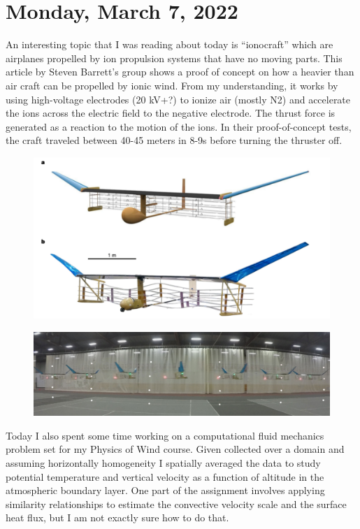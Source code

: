 \documentclass[12pt]{article}
\begin{document}
\section{Monday, March 7, 2022}
\par
An interesting topic that I was reading about today is “ionocraft” which are airplanes propelled by ion propulsion systems that have no moving parts. This article by Steven Barrett’s group shows a proof of concept on how a heavier than air craft can be propelled by ionic wind. From my understanding, it works by using high-voltage electrodes (20 kV+?) to ionize air (mostly N2) and accelerate the ions across the electric field to the negative electrode.  The thrust force is generated as a reaction to the motion of the ions. In their proof-of-concept tests, the craft traveled between 40-45 meters in 8-9s before turning the thruster off.

\begin{figure}[h]
\centering
\includegraphics[width=\linewidth]{images/ionicwindplane.pdf}
\end{figure}

\begin{figure}[h]
\centering
\includegraphics[width=\linewidth]{images/ionocraftmotion.pdf}
\end{figure}

\par
Today I also spent some time working on a computational fluid mechanics problem set for my Physics of Wind course. Given collected over a domain and assuming horizontally homogeneity I spatially averaged the data to study potential temperature and vertical velocity as a function of altitude in the atmospheric boundary layer. One part of the assignment involves applying similarity relationships to estimate the convective velocity scale and the surface heat flux, but I am not exactly sure how to do that. 
\end{document}
